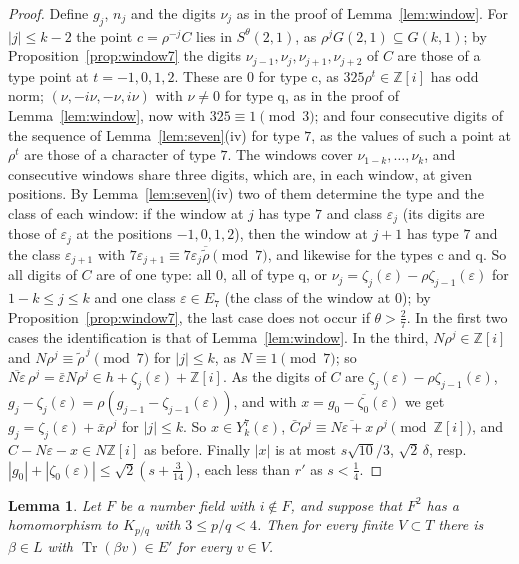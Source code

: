 \documentclass[11pt,a4paper]{amsart}
\newtheorem{lemma}{Lemma}
\theoremstyle{remark}
\newcommand{\Z}{\mathbb{Z}}
\newcommand{\Tr}{\operatorname{Tr}}
\begin{document}
\begin{proof}
Define $g_j$, $n_j$ and the digits $\nu_j$ as in the proof of Lemma~\ref{lem:window}. For $|j|\le k-2$ the point
$c=\rho^{-j}C$ lies in $S^\theta(2,1)$, as $\rho^jG(2,1)\subseteq G(k,1)$; by Proposition~\ref{prop:window7} the digits
$\nu_{j-1},\nu_j,\nu_{j+1},\nu_{j+2}$ of $C$ are those of a type point at $t=-1,0,1,2$. These are $0$ for type c, as
$325\rho^t\in\Z[i]$ has odd norm; $(\nu,-i\nu,-\nu,i\nu)$ with $\nu\ne0$ for type q, as in the proof of
Lemma~\ref{lem:window}, now with $325\equiv1\pmod3$; and four consecutive digits of the sequence of
Lemma~\ref{lem:seven}(iv) for type $7$, as the values of such a point at $\rho^t$ are those of a character of type $7$.
The windows cover $\nu_{1-k},\dots,\nu_k$, and consecutive windows share three digits, which are, in each window, at
given positions. By Lemma~\ref{lem:seven}(iv) two of them determine the type and the class of each window: if the
window at $j$ has type $7$ and class $\varepsilon_j$ (its digits are those of $\varepsilon_j$ at the positions
$-1,0,1,2$), then the window at $j+1$ has type $7$ and the class $\varepsilon_{j+1}$ with
$7\varepsilon_{j+1}\equiv7\varepsilon_j\overline{\tilde\rho}\pmod7$, and likewise for the types c and q. So all
digits of $C$ are of one type: all $0$, all of type q, or $\nu_j=\zeta_j(\varepsilon)-\rho\zeta_{j-1}(\varepsilon)$ for
$1-k\le j\le k$ and one class $\varepsilon\in E_7$ (the class of the window at $0$); by Proposition~\ref{prop:window7},
the last case does not occur if $\theta>\frac27$. In the first two cases the identification is that of
Lemma~\ref{lem:window}. In the third,
$N\rho^j\in\Z[i]$ and $N\rho^j\equiv\tilde\rho^{\,j}\pmod7$ for $|j|\le k$, as $N\equiv1\pmod7$; so
$\overline{N\varepsilon}\,\rho^j=\bar\varepsilon N\rho^j\in h+\zeta_j(\varepsilon)+\Z[i]$. As the digits of $C$ are
$\zeta_j(\varepsilon)-\rho\zeta_{j-1}(\varepsilon)$, $g_j-\zeta_j(\varepsilon)=\rho(g_{j-1}-\zeta_{j-1}(\varepsilon))$,
and with $x=\overline{g_0-\zeta_0(\varepsilon)}$ we get $g_j=\zeta_j(\varepsilon)+\bar x\rho^j$ for $|j|\le k$. So
$x\in Y^7_k(\varepsilon)$, $\bar C\rho^j\equiv\overline{N\varepsilon+x}\,\rho^j\pmod{\Z[i]}$, and
$C-N\varepsilon-x\in N\Z[i]$ as before. Finally $|x|$ is at most $s\sqrt{10}/3$, $\sqrt2\,\delta$, resp.\
$|g_0|+|\zeta_0(\varepsilon)|\le\sqrt2(s+\frac3{14})$, each less than $r'$ as $s<\frac14$.
\end{proof}

\begin{lemma}\label{lem:B1seven}
Let $F$ be a number field with $i\notin F$, and suppose that $F^2$ has a homomorphism to $K_{p/q}$ with $3\le
p/q<4$. Then for every finite $V\subset T$ there is $\beta\in L$ with $\Tr(\beta v)\in E'$ for every $v\in V$.
\end{lemma}
\end{document}
